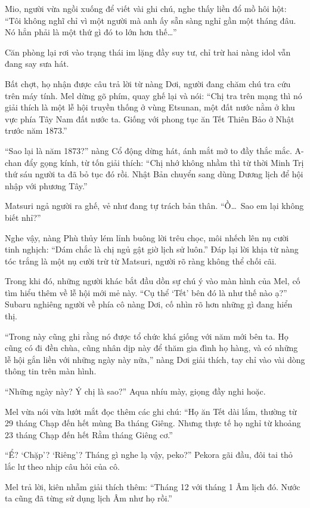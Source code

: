 \documentclass[../main.tex]{subfiles}
\begin{document}
Mio, người vừa ngồi xuống để viết vài ghi chú, nghe thấy liền đổ mồ hôi hột: ``Tôi không nghĩ chỉ vì một người mà anh ấy sẵn sàng nghỉ gần một tháng đâu. Nó hẳn phải là một thứ gì đó to lớn hơn thế\dots''

Căn phòng lại rơi vào trạng thái im lặng đầy suy tư, chỉ trừ hai nàng idol vẫn đang say sưa hát.

Bất chợt, họ nhận được câu trả lời từ nàng Dơi, người đang chăm chú tra cứu trên máy tính. Mel dừng gõ phím, quay ghế lại và nói: ``Chị tra trên mạng thì nó giải thích là một lễ hội truyền thống ở vùng Etsunan, một đất nước nằm ở khu vực phía Tây Nam đất nước ta. Giống với phong tục ăn Tết Thiên Bảo ở Nhật trước năm 1873.''

``Sao lại là năm 1873?'' nàng Cổ động dừng hát, ánh mắt mở to đầy thắc mắc. A-chan đẩy gọng kính, từ tốn giải thích: ``Chị nhớ không nhầm thì từ thời Minh Trị thứ sáu người ta đã bỏ tục đó rồi. Nhật Bản chuyển sang dùng Dương lịch để hội nhập với phương Tây.''

Matsuri ngả người ra ghế, vẻ như đang tự trách bản thân. ``Ồ\dots\ Sao em lại không biết nhỉ?''

Nghe vậy, nàng Phù thủy lém lỉnh buông lời trêu chọc, môi nhếch lên nụ cười tinh nghịch: ``Dám chắc là chị ngủ gật giờ lịch sử luôn.'' Đáp lại lời khịa từ nàng tóc trắng là một nụ cười trừ từ Matsuri, người rõ ràng không thể chối cãi.

Trong khi đó, những người khác bắt đầu dồn sự chú ý vào màn hình của Mel, cố tìm hiểu thêm về lễ hội mới mẻ này. ``Cụ thể `Tết' bên đó là như thế nào ạ?'' Subaru nghiêng người về phía cô nàng Dơi, cố nhìn rõ hơn những gì đang hiển thị.

``Trong này cũng ghi rằng nó được tổ chức khá giống với năm mới bên ta. Họ cũng có đi đền chùa, cũng nhân dịp này để thăm gia đình họ hàng, và có những lễ hội gắn liền với những ngày này nữa,'' nàng Dơi giải thích, tay chỉ vào vài dòng thông tin trên màn hình.

``Những ngày này? Ý chị là sao?'' Aqua nhíu mày, giọng đầy nghi hoặc.

Mel vừa nói vừa lướt mắt đọc thêm các ghi chú: ``Họ ăn Tết dài lắm, thường từ 29 tháng Chạp đến hết mùng Ba tháng Giêng. Nhưng thực tế họ nghỉ từ khoảng 23 tháng Chạp đến hết Rằm tháng Giêng cơ.''

``Ể? `Chặp'? `Riêng'? Tháng gì nghe lạ vậy, peko?'' Pekora gãi đầu, đôi tai thỏ lắc lư theo nhịp câu hỏi của cô.

Mel trả lời, kiên nhẫm giải thích thêm: ``Tháng 12 với tháng 1 Âm lịch đó. Nước ta cũng đã từng sử dụng lịch Âm như họ rồi.''
\end{document}
